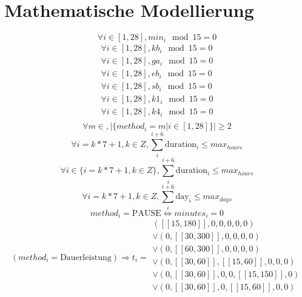\section{Mathematische Modellierung}
\label{anhang:modell}
\begin{equation*}
    \forall i \in [1, 28], min_i \mod 15 = 0
\end{equation*} 
\begin{equation*}
\begin{array}{c}
    \forall i \in [1, 28], kb_i \mod 15 = 0 \\
    \forall i \in [1, 28], ga_i \mod 15 = 0 \\
    \forall i \in [1, 28], eb_i \mod 15 = 0 \\
    \forall i \in [1, 28], sb_i \mod 15 = 0 \\
    \forall i \in [1, 28], k1_i \mod 15 = 0 \\
    \forall i \in [1, 28], k4_i \mod 15 = 0 \\
\end{array}
\end{equation*}
\begin{equation*} 
    \forall m \in ,|\{method_i = m | i \in [1, 28]\}| \geq 2
\end{equation*} 
\begin{equation*}
    \forall i = k * 7 + 1, k \in Z, \sum_{i}^{i+6} \text{duration}_i \leq max_{hours} 
\end{equation*}
\begin{equation*}
    \forall i \in \{ i = k * 7 + 1, k \in Z \}, \sum_{i}^{i+6} \text{duration}_i \leq max_{hours}
\end{equation*}
\begin{equation*}
    \forall i = k * 7 + 1, k \in Z, \sum_{i}^{i+6} \text{day}_i \leq max_{days}
\end{equation*}
\begin{equation*}
    method_i = \text{PAUSE} \Leftrightarrow minutes_i = 0
\end{equation*}
\begin{equation*}
    (method_i = \text{Dauerleistung})\Rightarrow t_i = \begin{array}{c}
            ([\![15, 180]\!], 0, 0, 0, 0, 0) \\ 
            \vee (0, [\![30, 300]\!], 0, 0, 0, 0) \\  
            \vee (0, [\![60, 300]\!], 0, 0, 0, 0) \\  
            \vee (0, [\![30, 60]\!], [\![15, 60]\!], 0, 0, 0) \\  
            \vee (0, [\![30, 60]\!], 0, 0, [\![15, 150]\!], 0) \\
            \vee (0, [\![30, 60]\!], 0, [\![15, 60]\!], 0, 0) \\  
    \end{array}
\end{equation*}
